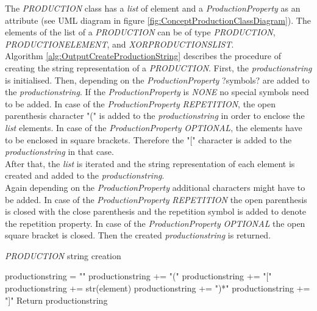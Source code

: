 The \textit{PRODUCTION} class has a \textit{list} of element and a \textit{ProductionProperty} as an attribute (see UML diagram in figure \ref{fig:ConceptProductionClassDiagram}).
The elements of the list of a \textit{PRODUCTION} can be of type \textit{PRODUCTION}, \textit{PRODUCTION\textunderscore ELEMENT}, and \textit{XOR\textunderscore PRODUCTIONS\textunderscore LIST}.\\
Algorithm \ref{alg:OutputCreateProductionString} describes the procedure of creating the string representation of a \textit{PRODUCTION}.
First, the \textit{production\textunderscore string} is initialised.
Then, depending on the \textit{ProductionProperty} ?symbols? are added to the \textit{production\textunderscore string}.
If the \textit{ProductionProperty} is \textit{NONE} no special symbols need to be added.
In case of the \textit{ProductionProperty} \textit{REPETITION}, the open parenthesis character "(" is added to the \textit{production\textunderscore string} in order to enclose the \textit{list} elements.
In case of the \textit{ProductionProperty} \textit{OPTIONAL}, the elements have to be enclosed in square brackets. Therefore the "[" character is added to the \textit{production\textunderscore string} in that case.\\
After that, the \textit{list} is iterated and the string representation of each element is created and added to the \textit{production\textunderscore string}.\\
Again depending on the \textit{ProductionProperty} additional characters might have to be added.
In case of the \textit{ProductionProperty} \textit{REPETITION} the open parenthesis is closed with the close parenthesis and the repetition symbol is added to denote the repetition property.
In case of the \textit{ProductionProperty} \textit{OPTIONAL} the open square bracket is closed.
Then the created \textit{production\textunderscore string} is returned.

\begin{algorithm}[H]
\caption{\textit{PRODUCTION} string creation}
\label{alg:OutputCreateProductionString}
\begin{algorithmic}[1]
\State production\textunderscore string = ""
	\State production\textunderscore string += "("
	\State production\textunderscore string += "["
\EndIf
{}
		\State production\textunderscore string += str(element)
\EndFor
{}
	\State production\textunderscore string += ")*"
	\State production\textunderscore string += "]"
\EndIf
\State Return production\textunderscore string
\end{algorithmic}
\end{algorithm}

